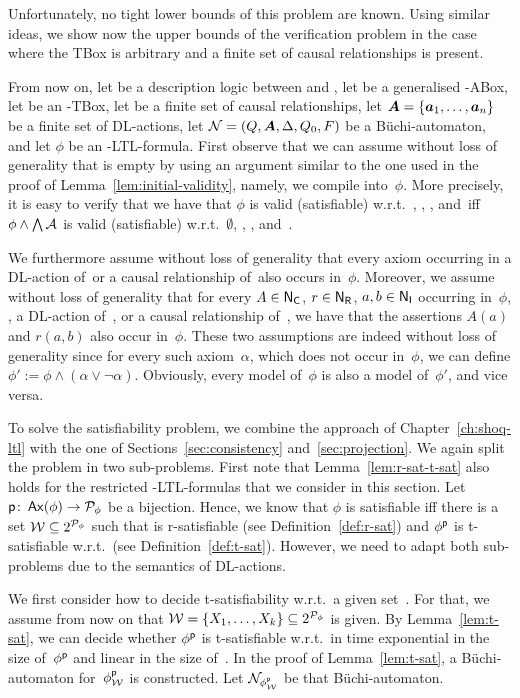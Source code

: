 \noindent
Unfortunately, no tight lower bounds of this problem are known.
%
Using similar ideas, we show now the upper bounds of the verification problem in
the case where the TBox is arbitrary and a finite set of causal relationships is
present.

From now on, let \Lmc be a description logic between \ALC and \ALCQIO, let \Amc
be a generalised \Lmc-ABox, let \Tmc be an \Lmc-TBox, let \CR be a finite set of
causal relationships, let $\boldsymbol A=\{\boldsymbol a_1,\dots,\boldsymbol a_n\}$ be a finite set of
DL-actions, let $\mathcal{N}=(Q,\boldsymbol A,\Delta,Q_0,F)$ be a Büchi-automaton, and let
$\phi$ be an \Lmc-LTL-formula.
%
First observe that we can assume without loss of generality that \Amc is empty
by using an argument similar to the one used in the proof of
Lemma~\ref{lem:initial-validity}, namely, we compile \Amc into~$\phi$.  More
precisely, it is easy to verify that we have that $\phi$ is valid (satisfiable)
w.r.t.~\Amc, \Tmc, \CR, and~\Nmc iff $\phi\land\bigwedge\mathcal{A}$ is valid
(satisfiable) w.r.t.~$\emptyset$, \Tmc, \CR, and~\Nmc.

We furthermore assume without loss of generality that every axiom occurring in a
DL-action of~\Abf or a causal relationship of~\CR also occurs in~$\phi$.
Moreover, we assume without loss of generality that for every $A\in\mathsf{N_C}$,
$r\in\mathsf{N_R}$, $a,b\in\mathsf{N_I}$ occurring in~$\phi$, \Tmc, a DL-action of~\Abf, or a
causal relationship of~\CR, we have that the assertions $A(a)$ and $r(a,b)$ also
occur in~$\phi$.
%
These two assumptions are indeed without loss of generality since for every such
axiom~$\alpha$, which does not occur in~$\phi$, we can define
$\phi':=\phi\land(\alpha\lor\lnot\alpha)$.  Obviously, every model of~$\phi$ is
also a model of~$\phi'$, and vice versa.

To solve the satisfiability problem, we combine the approach of
Chapter~\ref{ch:shoq-ltl} with the one of Sections~\ref{sec:consistency}
and~\ref{sec:projection}.
%
We again split the problem in two sub-problems.  First note that
Lemma~\ref{lem:r-sat-t-sat} also holds for the restricted \Lmc-LTL-formulas that
we consider in this section.
%
Let $\mathsf{p}\colon\operatorname{\mathsf{Ax}}(\phi)\to\mathcal{P}_\phi$ be a bijection.
%
Hence, we know that $\phi$ is satisfiable iff there is a set $\mathcal{W}\subseteq
2^{\mathcal{P}_\phi}$ such that \Wmc is r-satisfiable (see Definition~\ref{def:r-sat})
and $\phi^\mathsf{p}$ is t-satisfiable w.r.t.~\Wmc (see Definition~\ref{def:t-sat}).
However, we need to adapt both sub-problems due to the semantics of DL-actions.

We first consider how to decide t-satisfiability w.r.t.\ a given set~\Wmc.  For
that, we assume from now on that $\mathcal{W}=\{X_1,\dots,X_k\}\subseteq 2^{\mathcal{P}_\phi}$
is given.
%
By Lemma~\ref{lem:t-sat}, we can decide whether $\phi^\mathsf{p}$ is t-satisfiable
w.r.t.~\Wmc in time exponential in the size of~$\phi^\mathsf{p}$ and linear in the
size of~\Wmc.  In the proof of Lemma~\ref{lem:t-sat}, a Büchi-automaton
for~$\phi^\mathsf{p}_\mathcal{W}$ is constructed.  Let $\mathcal{N}_{\phi^\mathsf{p}_\mathcal{W}}$ be that
Büchi-automaton.

